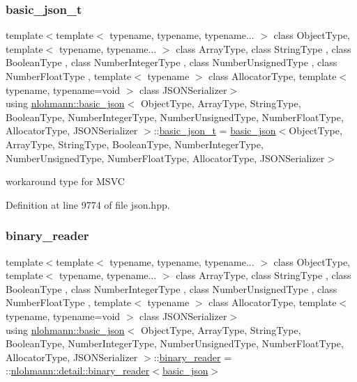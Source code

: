 \subsubsection{\texorpdfstring{basic\+\_\+json\+\_\+t}{basic\_json\_t}}
{\footnotesize\ttfamily template$<$template$<$ typename, typename, typename... $>$ class Object\+Type, template$<$ typename, typename... $>$ class Array\+Type, class String\+Type , class Boolean\+Type , class Number\+Integer\+Type , class Number\+Unsigned\+Type , class Number\+Float\+Type , template$<$ typename $>$ class Allocator\+Type, template$<$ typename, typename=void $>$ class J\+S\+O\+N\+Serializer$>$ \\
using \hyperlink{classnlohmann_1_1basic__json}{nlohmann\+::basic\+\_\+json}$<$ Object\+Type, Array\+Type, String\+Type, Boolean\+Type, Number\+Integer\+Type, Number\+Unsigned\+Type, Number\+Float\+Type, Allocator\+Type, J\+S\+O\+N\+Serializer $>$\+::\hyperlink{classnlohmann_1_1basic__json_afc4033f5af721feb287b0676723a145f}{basic\+\_\+json\+\_\+t} =  \hyperlink{classnlohmann_1_1basic__json}{basic\+\_\+json}$<$Object\+Type, Array\+Type, String\+Type, Boolean\+Type, Number\+Integer\+Type, Number\+Unsigned\+Type, Number\+Float\+Type, Allocator\+Type, J\+S\+O\+N\+Serializer$>$\hspace{0.3cm}{\ttfamily [private]}}



workaround type for M\+S\+VC 



Definition at line 9774 of file json.\+hpp.

\mbox{\label{classnlohmann_1_1basic__json_a7e06ed27ff517575ccb23fc23fca2b8f}} 
\subsubsection{\texorpdfstring{binary\+\_\+reader}{binary\_reader}}
{\footnotesize\ttfamily template$<$template$<$ typename, typename, typename... $>$ class Object\+Type, template$<$ typename, typename... $>$ class Array\+Type, class String\+Type , class Boolean\+Type , class Number\+Integer\+Type , class Number\+Unsigned\+Type , class Number\+Float\+Type , template$<$ typename $>$ class Allocator\+Type, template$<$ typename, typename=void $>$ class J\+S\+O\+N\+Serializer$>$ \\
using \hyperlink{classnlohmann_1_1basic__json}{nlohmann\+::basic\+\_\+json}$<$ Object\+Type, Array\+Type, String\+Type, Boolean\+Type, Number\+Integer\+Type, Number\+Unsigned\+Type, Number\+Float\+Type, Allocator\+Type, J\+S\+O\+N\+Serializer $>$\+::\hyperlink{classnlohmann_1_1basic__json_a7e06ed27ff517575ccb23fc23fca2b8f}{binary\+\_\+reader} =  \+::\hyperlink{classnlohmann_1_1detail_1_1binary__reader}{nlohmann\+::detail\+::binary\+\_\+reader}$<$\hyperlink{classnlohmann_1_1basic__json}{basic\+\_\+json}$>$\hspace{0.3cm}{\ttfamily [private]}}



